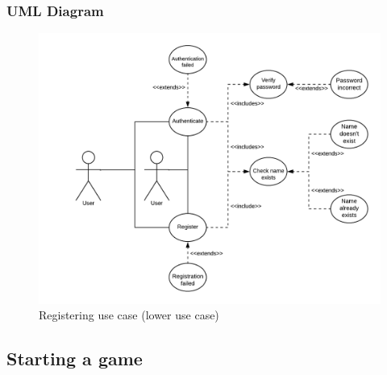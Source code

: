 \documentclass[10pt]{article}
\begin{document}
		\subsubsection{UML Diagram}
			\begin{figure}[H]
				\includegraphics[width=1.1\linewidth]{latex_images/LoginAndRegisterUseCase.png}
				\caption{Registering use case (lower use case)}
			\end{figure}
	\subsection{Starting a game}
\end{document}
